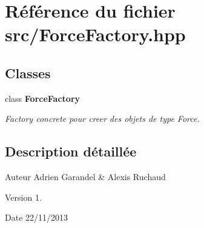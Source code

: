 \section{Référence du fichier src/\-Force\-Factory.hpp}
\label{_force_factory_8hpp}
\subsection*{Classes}
\begin{DoxyCompactItemize}
\item 
class {\bf Force\-Factory}
\begin{DoxyCompactList}\small\item\em Factory concrete pour creer des objets de type Force. \end{DoxyCompactList}\end{DoxyCompactItemize}


\subsection{Description détaillée}
\begin{DoxyAuthor}{Auteur}
Adrien Garandel \& Alexis Ruchaud 
\end{DoxyAuthor}
\begin{DoxyVersion}{Version}
1. 
\end{DoxyVersion}
\begin{DoxyDate}{Date}
22/11/2013 
\end{DoxyDate}
